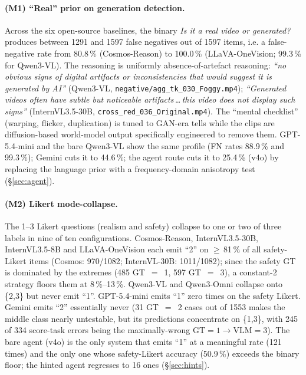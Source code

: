\documentclass[11pt,a4paper]{article}
\providecommand{\num}[1]{#1}
\newcommand{\pct}[1]{#1\,\%}
\newcommand{\code}[1]{\texttt{#1}}
\begin{document}
\paragraph{(M1) ``Real'' prior on generation detection.} Across the six
open-source baselines, the binary \emph{Is it a real video or
generated?} produces between \num{1291} and \num{1597} false negatives
out of \num{1597} items, i.e. a false-negative rate from \pct{80.8}
(Cosmos-Reason) to \pct{100.0} (LLaVA-OneVision; \pct{99.3} for
Qwen3-VL). The reasoning is uniformly absence-of-artefact reasoning:
\emph{``no obvious signs of digital artifacts or inconsistencies that
would suggest it is generated by AI''} (Qwen3-VL,
\code{negative/agg\_tk\_030\_Foggy.mp4}); \emph{``Generated videos
often have subtle but noticeable artifacts\,\dots\,this video does not
display such signs''} (InternVL3.5-30B,
\code{cross\_red\_036\_Original.mp4}). The ``mental checklist''
(warping, flicker, duplication) is tuned to GAN-era tells while the
clips are diffusion-based world-model output specifically engineered
to remove them. GPT-5.4-mini and the bare Qwen3-VL show the same
profile (FN rates \pct{88.9} and \pct{99.3}); Gemini cuts it to
\pct{44.6}; the agent route cuts it to \pct{25.4} (v4o) by replacing
the language prior with a frequency-domain anisotropy test
(\S\ref{sec:agent}).

\paragraph{(M2) Likert mode-collapse.} The 1--3 Likert questions
(realism and safety) collapse to one or two of three labels in nine of
ten configurations. Cosmos-Reason, InternVL3.5-30B, InternVL3.5-8B and
LLaVA-OneVision each emit ``2'' on $\geq$\,\pct{81} of all safety-Likert
items (Cosmos: 970/1082; InternVL-30B: 1011/1082); since the safety GT
is dominated by the extremes (485 GT~$=$~1, 597 GT~$=$~3), a constant-2
strategy floors them at \pct{8}--\pct{13}. Qwen3-VL and Qwen3-Omni
collapse onto \{2,3\} but never emit ``1''. GPT-5.4-mini emits ``1'' zero
times on the safety Likert. Gemini emits ``2'' essentially never (31
GT~$=$~2 cases out of 1553 makes the middle class nearly untestable, but
its predictions concentrate on \{1,3\}, with 245 of 334 score-task errors
being the maximally-wrong $\text{GT}=1\to\text{VLM}=3$). The bare agent
(v4o) is the only system that emits ``1'' at a meaningful rate (121
times) and the only one whose safety-Likert accuracy
(\pct{50.9}) exceeds the binary floor; the hinted agent regresses to 16
ones (\S\ref{sec:hints}).
\end{document}
